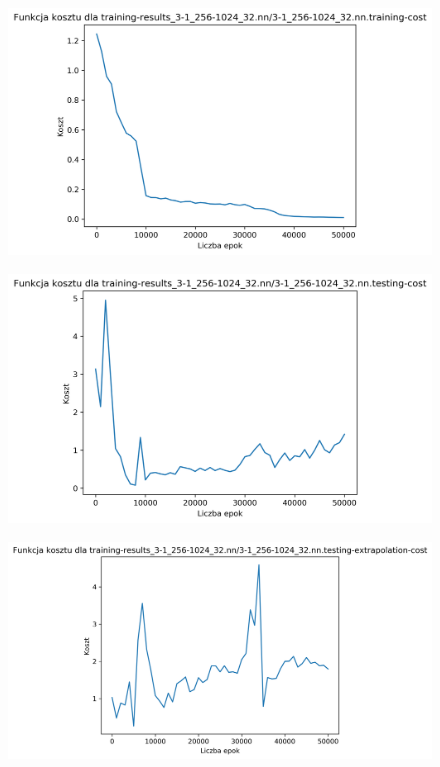 \documentclass{classrep}
\begin{document}
{{\begin{figure}[!htbp]
            \end{figure}
            \begin{figure}[!htbp]
                \centering
                \includegraphics[width=120mm]{wykresy/3-1_256-1024_32_nn_training-cost.png}
            \end{figure}
            \begin{figure}[!htbp]
                \centering
                \includegraphics[width=120mm]{wykresy/3-1_256-1024_32_nn_testing-cost.png}
            \end{figure}
            \begin{figure}[!htbp]
                \centering
                \includegraphics[width=140mm]{wykresy/3-1_256-1024_32_nn_testing-extrapolation-cost.png}

\end{figure}}}
\end{document}
